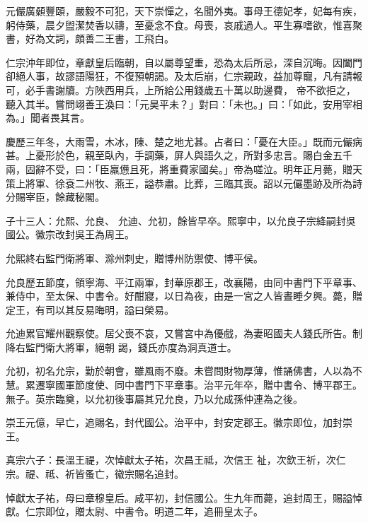 \begin{pinyinscope}
 元儼廣顙豐頤，嚴毅不可犯，天下崇憚之，名聞外夷。事母王德妃孝，妃每有疾，躬侍藥，晨夕盥潔焚香以禱，至憂念不食。母喪，哀戚過人。平生寡嗜欲，惟喜聚書，好為文詞，頗善二王書，工飛白。



 仁宗沖年即位，章獻皇后臨朝，自以屬尊望重，恐為太后所忌，深自沉晦。因闔門卻絕人事，故謬語陽狂，不復預朝謁。及太后崩，仁宗親政，益加尊寵，凡有請報可，必手書謝牘。方陜西用兵，上所給公用錢歲五十萬以助邊費，
 帝不欲拒之，聽入其半。嘗問翊善王渙曰：「元昊平未？」對曰：「未也。」曰：「如此，安用宰相為。」聞者畏其言。



 慶歷三年冬，大雨雪，木冰，陳、楚之地尤甚。占者曰：「憂在大臣。」既而元儼病甚。上憂形於色，親至臥內，手調藥，屏人與語久之，所對多忠言。賜白金五千兩，固辭不受，曰：「臣羸憊且死，將重費家國矣。」帝為嗟泣。明年正月薨，贈天策上將軍、徐袞二州牧、燕王，謚恭肅。比葬，三臨其喪。詔以元儼墨跡及所為詩分賜宰臣，餘藏秘閣。



 子十三人：允熙、允良、
 允迪、允初，餘皆早卒。熙寧中，以允良子宗絳嗣封吳國公。徽宗改封吳王為周王。



 允熙終右監門衛將軍、滁州刺史，贈博州防禦使、博平侯。



 允良歷五節度，領寧海、平江兩軍，封華原郡王，改襄陽，由同中書門下平章事、兼侍中，至太保、中書令。好酣寢，以日為夜，由是一宮之人皆晝睡夕興。薨，贈定王，有司以其反易晦明，謚曰榮易。



 允迪累官耀州觀察使。居父喪不哀，又嘗宮中為優戲，為妻昭國夫人錢氏所告。制降右監門衛大將軍，絕朝
 謁，錢氏亦度為洞真道士。



 允初，初名允宗，勤於朝會，雖風雨不廢。未嘗問財物厚薄，惟誦佛書，人以為不慧。累遷寧國軍節度使、同中書門下平章事。治平元年卒，贈中書令、博平郡王。無子。英宗臨奠，以允初後事屬其兄允良，乃以允成孫仲連為之後。



 崇王元億，早亡，追賜名，封代國公。治平中，封安定郡王。徽宗即位，加封崇王。



 真宗六子：長溫王禔，次悼獻太子祐，次昌王祗，次信王
 祉，次欽王祈，次仁宗。禔、祗、祈皆蚤亡，徽宗賜名追封。



 悼獻太子祐，母曰章穆皇后。咸平初，封信國公。生九年而薨，追封周王，賜謚悼獻。仁宗即位，贈太尉、中書令。明道二年，追冊皇太子。




\end{pinyinscope}
